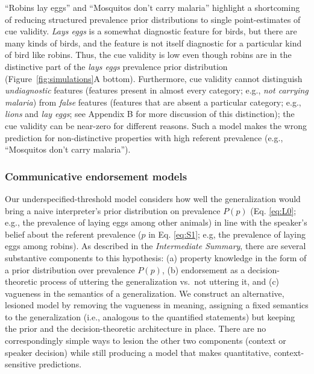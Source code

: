 \documentclass[english,,man,floatsintext]{apa6}
\theoremstyle{definition}
\theoremstyle{definition}
\theoremstyle{definition}
\theoremstyle{remark}
\begin{document}
\enquote{Robins lay eggs} and \enquote{Mosquitos don't carry malaria}
highlight a shortcoming of reducing structured prevalence prior
distributions to single point-estimates of cue validity. \emph{Lays
eggs} is a somewhat diagnostic feature for birds, but there are many
kinds of birds, and the feature is not itself diagnostic for a
particular kind of bird like robins. Thus, the cue validity is low even
though robins are in the distinctive part of the \emph{lays eggs}
prevalence prior distribution (Figure~\ref{fig:simulations}A bottom).
Furthermore, cue validity cannot distinguish \emph{undiagnostic}
features (features present in almost every category; e.g., \emph{not
carrying malaria}) from \emph{false} features (features that are absent
a particular category; e.g., \emph{lions} and \emph{lay eggs}; see
Appendix B for more discussion of this distinction); the cue validity
can be near-zero for different reasons. Such a model makes the wrong
prediction for non-distinctive properties with high referent prevalence
(e.g., \enquote{Mosquitos don't carry malaria}).

\hypertarget{communicative-endorsement-models}{%
\subsubsection{Communicative endorsement
models}\label{communicative-endorsement-models}}

Our underspecified-threshold model considers how well the generalization
would bring a naive interpreter's prior distribution on prevalence
\(P(p)\) (Eq. \ref{eq:L0}; e.g., the prevalence of laying eggs among
other animals) in line with the speaker's belief about the referent
prevalence (\(p\) in Eq. \ref{eq:S1}; e.g, the prevalence of laying eggs
among robins). As described in the \emph{Intermediate Summary}, there
are several substantive components to this hypothesis: (a) property
knowledge in the form of a prior distribution over prevalence \(P(p)\),
(b) endorsement as a decision-theoretic process of uttering the
generalization vs.~not uttering it, and (c) vagueness in the semantics
of a generalization. We construct an alternative, lesioned model by
removing the vagueness in meaning, assigning a fixed semantics to the
generalization (i.e., analogous to the quantified statements) but
keeping the prior and the decision-theoretic architecture in place.
There are no correspondingly simple ways to lesion the other two
components (context or speaker decision) while still producing a model
that makes quantitative, context-sensitive predictions.
\end{document}
